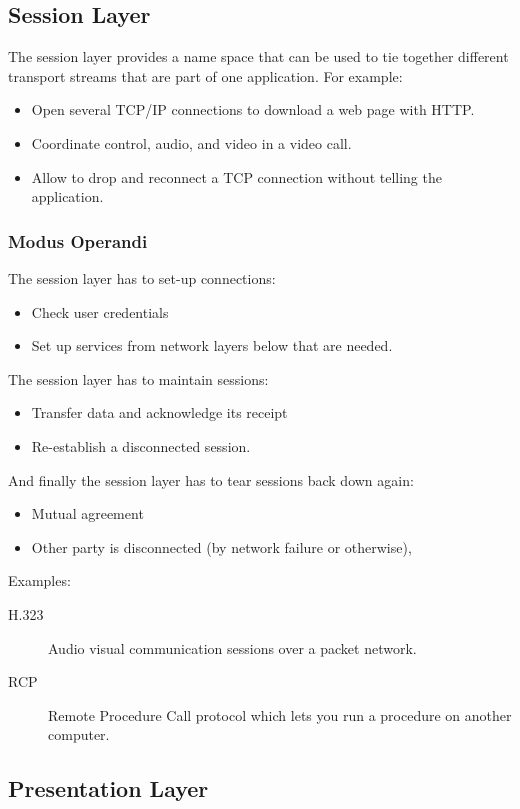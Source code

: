 \subsection{Session Layer}\label{sub:session_layer}

The session layer provides a name space that can be used to tie together different transport streams that are part of one application.
For example:
\begin{itemize}
	\item Open several TCP/IP connections to download a web page with HTTP.
	\item Coordinate control, audio, and video in a video call.
	\item Allow to drop and reconnect a TCP connection without telling the application.
\end{itemize}

\subsubsection{Modus Operandi}\label{ssub:modus_operandi}

The session layer has to set-up connections:
\begin{itemize}
	\item Check user credentials
	\item Set up services from network layers below that are needed.
\end{itemize}
The session layer has to maintain sessions:
\begin{itemize}
	\item Transfer data and acknowledge its receipt
	\item Re-establish a disconnected session.
\end{itemize}
And finally the session layer has to tear sessions back down again:
\begin{itemize}
	\item Mutual agreement
	\item Other party is disconnected (by network failure or otherwise),
\end{itemize}
Examples:
\begin{description}
	\item[H.323] Audio visual communication sessions over a packet network.
	\item[RCP] Remote Procedure Call protocol which lets you run a procedure on another computer.
\end{description}

\subsection{Presentation Layer}\label{sub:presentation_layer}

